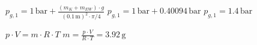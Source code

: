 \( p_{g,1} = 1 \, \text{bar} + \frac{(m_K + m_{EW}) \cdot g}{\left(0.1 \, \text{m}\right)^2 \cdot \pi / 4} \)  
\( p_{g,1} = 1 \, \text{bar} + 0.40094 \, \text{bar} \)  
\( p_{g,1} = 1.4 \, \text{bar} \)  

\( p \cdot V = m \cdot R \cdot T \)  
\( m = \frac{p \cdot V}{R \cdot T} = 3.92 \, \text{g} \)